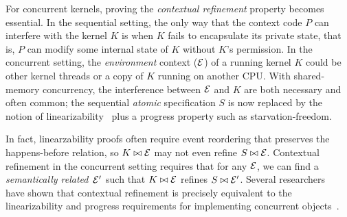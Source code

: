 For concurrent kernels, proving the {\em contextual refinement}
property becomes essential. In the sequential setting, the only way
that the context code $P$ can interfere with the kernel $K$ is when
$K$ fails to encapsulate its private state, that is, $P$ can
modify some internal state of $K$ without $K$'s permission.
In the concurrent setting, the {\em environment} context ($\mathcal{E}$)
of a running kernel $K$ could be other kernel threads or a copy of $K$
running on another CPU. With shared-memory concurrency, the
interference between $\mathcal{E}$ and $K$ are both necessary and often
common; the sequential {\em atomic} specification $S$ is now replaced
by the notion of linearizability~\cite{herlihy90} plus a progress
property such as starvation-freedom.

In fact, linearzability proofs often require event reordering that
preserves the happens-before relation, so $K\,\!\bowtie\!{}\,\mathcal{E}$ may not
even refine $S\,\!\bowtie\!{}\,\mathcal{E}$.  Contextual refinement in the
concurrent setting requires that for any $\mathcal{E}$, we can find a {\em
  semantically related}\ $\mathcal{E}'$ such that $K\,\!\bowtie\!{}\,\mathcal{E}$ refines
$S\,\!\bowtie\!{}\,\mathcal{E}'$.  Several
researchers~\cite{filipovic10,liang13,lili16} have shown that
contextual refinement is precisely equivalent to the linearizability
and progress requirements for implementing concurrent
objects~\cite{Herlihy08book,herlihy90}.

